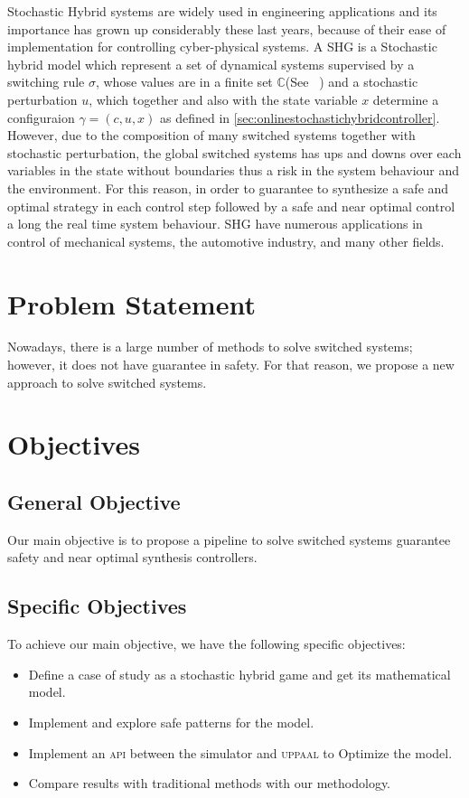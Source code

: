     Stochastic Hybrid systems are widely used in engineering 
    applications and its importance has grown up considerably 
    these last years, because of their ease of implementation 
    for controlling cyber-physical systems. A \ac{SHG} is a Stochastic 
    hybrid model which represent a set of dynamical systems supervised by 
    a switching rule $\sigma$, whose values are in a finite set 
    $\mathbb{C}$(See ~\cite{liberzon2003switching}) and a stochastic
    perturbation $u$, which together and also with the state variable $x$
    determine a configuraion $\gamma = (c,u,x)$ as defined in 
    \autoref{sec:onlinestochastichybridcontroller}. However, due to 
    the composition of many switched systems together with stochastic 
    perturbation, the global switched systems has ups and downs
    over each variables in the state without boundaries thus a risk
    in the system behaviour and the environment. For this reason,
    in order to guarantee to synthesize a safe and optimal strategy
    in each control step followed by a safe and near optimal control
    a long the real time system behaviour. \ac{SHG} have numerous applications 
    in control of mechanical systems, the automotive industry, and 
    many other fields. 
    
    \section{Problem Statement}
    \label{sec:problem}
    Nowadays, there is a large number of methods to solve switched systems;
    however, it does not have guarantee in safety. For that reason, we 
    propose a new approach to solve switched systems. 
    
    \section{Objectives}
    \label{sec:objectives}

        \subsection*{General Objective}
        Our main objective is to propose a pipeline to solve switched systems guarantee safety and near optimal synthesis controllers. 

        \subsection*{Specific Objectives}
        To achieve our main objective, we have the following specific objectives:
        \begin{itemize}
            \item Define a case of study as a stochastic hybrid game and get its mathematical model.
            \item Implement and explore safe patterns for the model.
            \item Implement an \textsc{api} between the simulator and \textsc{uppaal} to Optimize the model.
            \item Compare results with traditional methods with our methodology.
        \end{itemize}


